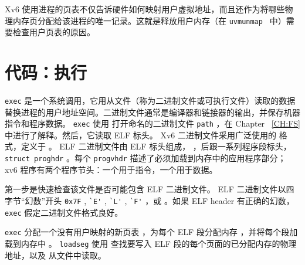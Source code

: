 Xv6 使用进程的页表不仅告诉硬件如何映射用户虚拟地址，而且还作为将哪些物理内存页分配给该进程的唯一记录。这就是释放用户内存（在  {    \tt    uvmunmap   }  中）需要检查用户页表的原因。
    \section{代码：执行  }   
    \lstinline{exec}    是一个系统调用，它用从文件（称为二进制文件或可执行文件）读取的数据替换进程的用户地址空间。二进制文件通常是编译器和链接器的输出，并保存机器指令和程序数据。
    \lstinline{exec}            使用        打开命名的二进制文件    \lstinline{path}   
       ，在 Chapter~    \ref{CH:FS}    中进行了解释。然后，它读取 ELF 标头。 Xv6 二进制文件采用广泛使用的        格式，定义于
        。 ELF 二进制文件由 ELF 标头组成，
               ，后跟一系列程序段标头，
    \lstinline{struct proghdr}          。每个
    \lstinline{progvhdr}    描述了必须加载到内存中的应用程序部分； xv6 程序有两个程序节头：一个用于指令，一个用于数据。  

第一步是快速检查该文件是否可能包含 ELF 二进制文件。 ELF 二进制文件以四字节“幻数”开头
    \lstinline{0x7F}    ,
    \lstinline{`E'}    ,
    \lstinline{`L'}    ,
    \lstinline{`F'}   ，或
        。如果 ELF header 有正确的幻数，
    \lstinline{exec}    假定二进制文件格式良好。  

   \lstinline{exec}    分配一个没有用户映射的新页表
        ，为每个 ELF 段分配内存
        ，并将每个段加载到内存中
        。
    \lstinline{loadseg}    使用
        查找要写入 ELF 段的每个页面的已分配内存的物理地址，以及
        从文件中读取。  

